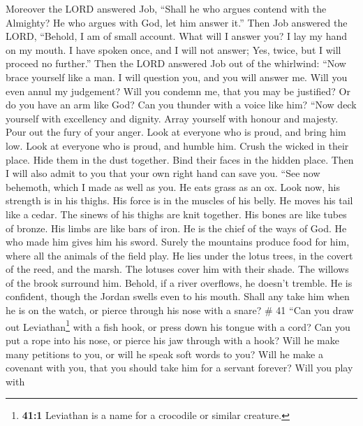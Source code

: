 Moreover the LORD answered Job,  ``Shall he who argues
contend with the Almighty? He who argues with God, let him answer it.''
 Then Job answered the LORD,  ``Behold, I am
of small account. What will I answer you? I lay my hand on my mouth.
 I have spoken once, and I will not answer; Yes, twice,
but I will proceed no further.''  Then the LORD answered
Job out of the whirlwind:  ``Now brace yourself like a
man. I will question you, and you will answer me.  Will
you even annul my judgement? Will you condemn me, that you may be
justified?  Or do you have an arm like God? Can you
thunder with a voice like him?  ``Now deck yourself with
excellency and dignity. Array yourself with honour and majesty.
 Pour out the fury of your anger. Look at everyone who is
proud, and bring him low.  Look at everyone who is proud,
and humble him. Crush the wicked in their place.  Hide
them in the dust together. Bind their faces in the hidden place.
 Then I will also admit to you that your own right hand
can save you.  ``See now behemoth, which I made as well
as you. He eats grass as an ox.  Look now, his strength
is in his thighs. His force is in the muscles of his belly.
 He moves his tail like a cedar. The sinews of his thighs
are knit together.  His bones are like tubes of bronze.
His limbs are like bars of iron.  He is the chief of the
ways of God. He who made him gives him his sword.  Surely
the mountains produce food for him, where all the animals of the field
play.  He lies under the lotus trees, in the covert of
the reed, and the marsh.  The lotuses cover him with
their shade. The willows of the brook surround him. 
Behold, if a river overflows, he doesn't tremble. He is confident,
though the Jordan swells even to his mouth.  Shall any
take him when he is on the watch, or pierce through his nose with a
snare? \# 41  ``Can you draw out Leviathan\footnote{\textbf{41:1}
  Leviathan is a name for a crocodile or similar creature.} with a fish
hook, or press down his tongue with a cord?  Can you put a
rope into his nose, or pierce his jaw through with a hook?
 Will he make many petitions to you, or will he speak soft
words to you?  Will he make a covenant with you, that you
should take him for a servant forever?  Will you play with
